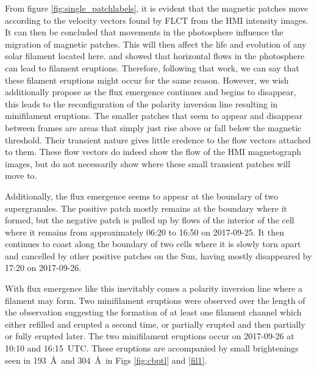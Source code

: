 From figure \ref{fig:single_patchlabels}, it is evident that the magnetic patches move according to the velocity vectors found by FLCT from the HMI intensity images. It can then be concluded that movements in the photosphere influence the migration of magnetic patches. This will then affect the life and evolution of any solar filament located here. \cite{roudier_horizontal_2018} and \cite{wollmann_evolution_2020} showed that horizontal flows in the photosphere can lead to filament eruptions. Therefore, following that work, we can say that these filament eruptions might occur for the same reason. However, we wish additionally propose as the flux emergence continues and begins to disappear, this leads to the reconfiguration of the polarity inversion line resulting in minifilament eruptions. The smaller patches that seem to appear and disappear between frames are areas that simply just rise above or fall below the magnetic threshold. Their transient nature gives little credence to the flow vectors attached to them. These flow vectors do indeed show the flow of the HMI magnetograph images, but do not necessarily show where these small transient patches will move to.

Additionally, the flux emergence seems to appear at the boundary of two supergranules. The positive patch mostly remains at the boundary where it formed, but the negative patch is pulled up by flows of the interior of the cell where it remains from approximately 06:20 to 16:50 on 2017-09-25. It then continues to coast along the boundary of two cells where it is slowly torn apart and cancelled by other positive patches on the Sun, having mostly disappeared by 17:20 on 2017-09-26.


With flux emergence like this inevitably comes a polarity inversion line where a filament may form. Two minifilament eruptions were observed over the length of the observation suggesting the formation of at least one filament channel which either refilled and erupted a second time, or partially erupted and then partially or fully erupted later. The two minifilament eruptions occur on 2017-09-26 at 10:10 and 16:15~UTC. These eruptions are accompanied by small brightenings seen in 193~\AA\ and 304~\AA\ in Figs \ref{fig:cbptl} and \ref{fil1}. 

